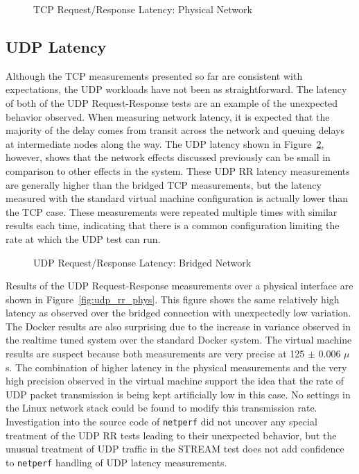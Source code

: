 \begin{figure}
    \centering
    \def\svgwidth{\columnwidth}
    
    \caption{TCP Request/Response Latency: Physical Network}
    \label{fig:tcp_rr_phys}
\end{figure}


\subsection{UDP Latency} %
\label{sub:udplatency}

Although the TCP measurements presented so far are consistent with expectations, the UDP workloads have not been as straightforward.
The latency of both of the UDP Request-Response tests are an example of the unexpected behavior observed.
When measuring network latency, it is expected that the majority of the delay comes from transit across the network and queuing delays at intermediate nodes along the way.  
The UDP latency shown in Figure~\ref{fig:udp_rr_bridge}, however, shows that the network effects discussed previously can be small in comparison to other effects in the system.
These UDP RR latency measurements are generally higher than the bridged TCP measurements, but the latency measured with the standard virtual machine configuration is actually lower than the TCP case.
These measurements were repeated multiple times with similar results each time, indicating that there is a common configuration limiting the rate at which the UDP test can run.

\begin{figure}
    \centering
    \def\svgwidth{\columnwidth}
    
    \caption{UDP Request/Response Latency: Bridged Network}
    \label{fig:udp_rr_bridge}
\end{figure}

Results of the UDP Request-Response measurements over a physical interface are shown in Figure~\ref{fig:udp_rr_phys}.  
This figure shows the same relatively high latency as observed over the bridged connection with unexpectedly low variation.
The Docker results are also surprising due to the increase in variance observed in the realtime tuned system over the standard Docker system.
The virtual machine results are suspect because both measurements are very precise at 125 $\pm$ 0.006 $\mu$s.  
The combination of higher latency in the physical measurements and the very high precision observed in the virtual machine support the idea that the rate of UDP packet transmission is being kept artificially low in this case.  
No settings in the Linux network stack could be found to modify this transmission rate.  
Investigation into the source code of \texttt{netperf} did not uncover any special treatment of the UDP RR tests leading to their unexpected behavior, but the unusual treatment of UDP traffic in the STREAM test does not add confidence to \texttt{netperf} handling of UDP latency measurements.

